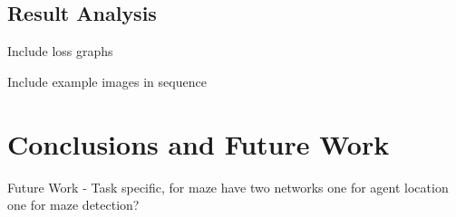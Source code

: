 \documentclass[12pt,american]{report}
\providecommand{\DIFaddbegin}{} %
\providecommand{\DIFaddend}{} %
\newcommand{\DIFaddincludegraphics}[2][]{{\color{blue}\fbox{\DIFOincludegraphics[#1]{#2}}}} %
\DeclareRobustCommand{\DIFaddbegin}{\DIFOaddbegin \let\includegraphics\DIFaddincludegraphics} %
\DeclareRobustCommand{\DIFaddend}{\DIFOaddend \let\includegraphics\DIFOincludegraphics} %
\begin{document}
\section{Result Analysis}
Include loss graphs

Include example images in sequence


\chapter{Conclusions and Future Work}
\DIFaddbegin \label{sec:conclusions}
\DIFaddend 


Future Work
- Task specific, for maze have two networks one for agent location one for maze detection?


  \nocite{*}


\begin{singlespace}

\end{singlespace}

\appendix
\end{document}
